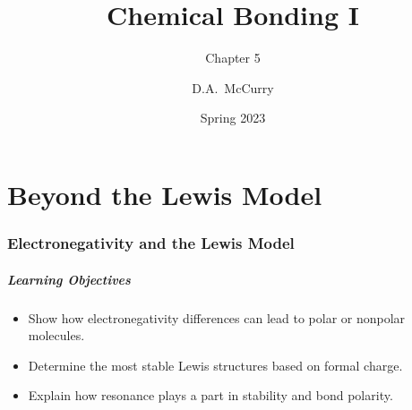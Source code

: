 \documentclass[notes=hide]{beamer}
\title{Chemical Bonding I}
\subtitle{Chapter 5}
\institute[CHEM115 Bloomsburg University]{CHEM115 --- Chemistry for the Sciences I \\ Bloomsburg University}
\author{D.A.\ McCurry}
\date{Spring 2023}
\begin{document}
\maketitle

%
%
%
%

\part{Beyond the Lewis Model}

\section{Electronegativity and the Lewis Model}
\begin{frame}
	\frametitle{Learning Objectives}

	\begin{itemize}
	\item Show how electronegativity differences can lead to polar or
		nonpolar molecules.
	\item Determine the most stable Lewis structures based on formal charge.
	\item Explain how resonance plays a part in stability and bond
		polarity.
	\end{itemize}
\end{frame}
\end{document}
